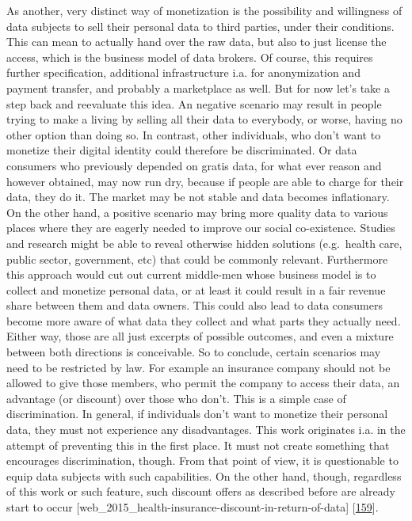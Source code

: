 \documentclass[12pt,english,a4paper,titlepage,cleardoublepage=empty,dottedtoc]{report}
\begin{document}
As another, very distinct way of monetization is the possibility and
willingness of data subjects to sell their personal data to third
parties, under their conditions. This can mean to actually hand over the
raw data, but also to just license the access, which is the business
model of data brokers. Of course, this requires further specification,
additional infrastructure i.a. for anonymization and payment transfer,
and probably a marketplace as well. But for now let's take a step back
and reevaluate this idea. An negative scenario may result in people
trying to make a living by selling all their data to everybody, or
worse, having no other option than doing so. In contrast, other
individuals, who don't want to monetize their digital identity could
therefore be discriminated. Or data consumers who previously depended on
gratis data, for what ever reason and however obtained, may now run dry,
because if people are able to charge for their data, they do it. The
market may be not stable and data becomes inflationary. On the other
hand, a positive scenario may bring more quality data to various places
where they are eagerly needed to improve our social co-existence.
Studies and research might be able to reveal otherwise hidden solutions
(e.g.~health care, public sector, government, etc) that could be
commonly relevant. Furthermore this approach would cut out current
middle-men whose business model is to collect and monetize personal
data, or at least it could result in a fair revenue share between them
and data owners. This could also lead to data consumers become more
aware of what data they collect and what parts they actually need.
Either way, those are all just excerpts of possible outcomes, and even a
mixture between both directions is conceivable. So to conclude, certain
scenarios may need to be restricted by law. For example an insurance
company should not be allowed to give those members, who permit the
company to access their data, an advantage (or discount) over those who
don't. This is a simple case of discrimination. In general, if
individuals don't want to monetize their personal data, they must not
experience any disadvantages. This work originates i.a. in the attempt
of preventing this in the first place. It must not create something that
encourages discrimination, though. From that point of view, it is
questionable to equip data subjects with such capabilities. On the other
hand, though, regardless of this work or such feature, such discount
offers as described before are already start to occur
{[}web\_2015\_health-insurance-discount-in-return-of-data{]}
{[}\protect\hyperlink{ref-web_2016_insurance-discount-in-return-of-data}{159}{]}.
\end{document}
